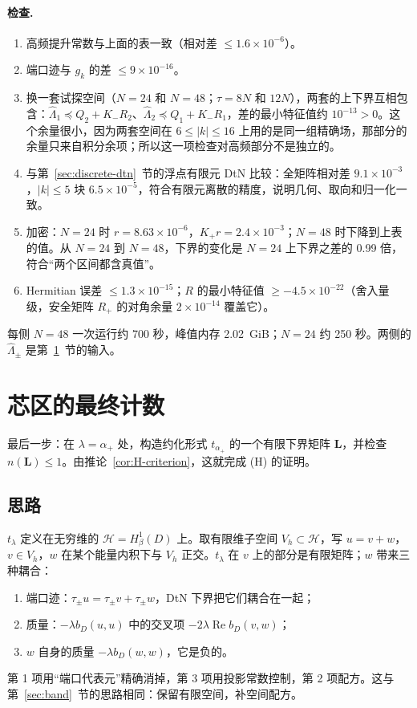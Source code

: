 \documentclass[11pt,a4paper,fontset=fandol]{ctexart}
\begin{document}
\paragraph{检查.}
\begin{enumerate}
\item 高频提升常数与上面的表一致（相对差 $\le1.6\times10^{-6}$）。
\item 端口迹与 $g_k$ 的差 $\le9\times10^{-16}$。
\item 换一套试探空间（$N=24$ 和 $N=48$；$\tau=8N$ 和 $12N$），两套的上下界互相包含：$\hat\Lambda_1\preceq Q_2+K_-R_2$、$\hat\Lambda_2\preceq Q_1+K_-R_1$，差的最小特征值约 $10^{-13}>0$。这个余量很小，因为两套空间在 $6\le|k|\le16$ 上用的是同一组精确场，那部分的余量只来自积分余项；所以这一项检查对高频部分不是独立的。
\item 与第~\ref{sec:discrete-dtn}~节的浮点有限元 DtN 比较：全矩阵相对差 $9.1\times10^{-3}$，$|k|\le5$ 块 $6.5\times10^{-5}$，符合有限元离散的精度，说明几何、取向和归一化一致。
\item 加密：$N=24$ 时 $r=8.63\times10^{-6}$，$K_+r=2.4\times10^{-3}$；$N=48$ 时下降到上表的值。从 $N=24$ 到 $N=48$，下界的变化是 $N=24$ 上下界之差的 0.99 倍，符合“两个区间都含真值”。
\item Hermitian 误差 $\le1.3\times10^{-15}$；$R$ 的最小特征值 $\ge-4.5\times10^{-22}$（舍入量级，安全矩阵 $R_+$ 的对角余量 $2\times10^{-14}$ 覆盖它）。
\end{enumerate}

每侧 $N=48$ 一次运行约 700 秒，峰值内存 2.02~GiB；$N=24$ 约 250 秒。两侧的 $\hat\Lambda_\pm$ 是第~\ref{sec:count}~节的输入。

\section{芯区的最终计数}
\label{sec:count}
最后一步：在 $\lambda=\alpha_+$ 处，构造约化形式 $t_{\alpha_+}$ 的一个有限下界矩阵 $\bm L$，并检查 $n(\bm L)\le1$。由推论~\ref{cor:H-criterion}，这就完成 (H) 的证明。

\subsection{思路}

$t_\lambda$ 定义在无穷维的 $\mathcal H=H^1_\beta(D)$ 上。取有限维子空间 $V_h\subset\mathcal H$，写 $u=v+w$，$v\in V_h$，$w$ 在某个能量内积下与 $V_h$ 正交。$t_\lambda$ 在 $v$ 上的部分是有限矩阵；$w$ 带来三种耦合：
\begin{enumerate}
\item 端口迹：$\tau_\pm u=\tau_\pm v+\tau_\pm w$，DtN 下界把它们耦合在一起；
\item 质量：$-\lambda b_D(u,u)$ 中的交叉项 $-2\lambda\operatorname{Re}b_D(v,w)$；
\item $w$ 自身的质量 $-\lambda b_D(w,w)$，它是负的。
\end{enumerate}
第 1 项用“端口代表元”精确消掉，第 3 项用投影常数控制，第 2 项配方。这与第~\ref{sec:band}~节的思路相同：保留有限空间，补空间配方。
\end{document}

